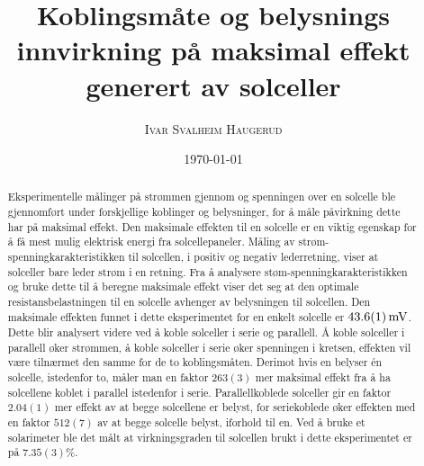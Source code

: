 \documentclass[%
 reprint,
 amsmath,amssymb,
 aps,
 norsk,
 booktabs
]{revtex4-1}
\begin{document}
\title{Koblingsmåte og belysnings innvirkning på maksimal effekt generert av solceller}
\author{\textsc{Ivar Svalheim Haugerud}}
\date{\today}

\begin{abstract}
Eksperimentelle målinger på strømmen gjennom og spenningen over en solcelle ble gjennomført under forskjellige koblinger og belysninger, for å måle påvirkning dette har på maksimal effekt. Den maksimale effekten til en solcelle er en viktig egenskap for å få mest mulig elektrisk energi fra solcellepaneler. Måling av strøm-spenningkarakteristikken til solcellen, i positiv og negativ lederretning, viser at solceller bare leder strøm i en retning. Fra å analysere støm-spenningkarakteristikken og bruke dette til å beregne maksimale effekt viser det seg at den optimale resistansbelastningen til en solcelle avhenger av belysningen til solcellen. Den maksimale effekten funnet i dette eksperimentet for en enkelt solcelle er $\SI{43.6\pm0.1}{\milli\volt}$. Dette blir analysert videre ved å koble solceller i serie og parallell. Å koble solceller i parallell øker strømmen, å koble solceller i serie øker spenningen i kretsen, effekten vil være tilnærmet den samme for de to koblingsmåten. Derimot hvis en belyser én solcelle, istedenfor to, måler man en faktor $263(3)$ mer maksimal effekt fra å ha solcellene koblet i parallel istedenfor i serie. Parallellkoblede solceller gir en faktor $2.04(1)$ mer effekt av at begge solcellene er belyst, for seriekoblede øker effekten med en faktor $512(7)$ av at begge solcelle belyst, iforhold til en. Ved å bruke et solarimeter ble det målt at virkningsgraden til solcellen brukt i dette eksperimentet er på $7.35(3)\%$.
\end{abstract}

\maketitle

\end{document}
